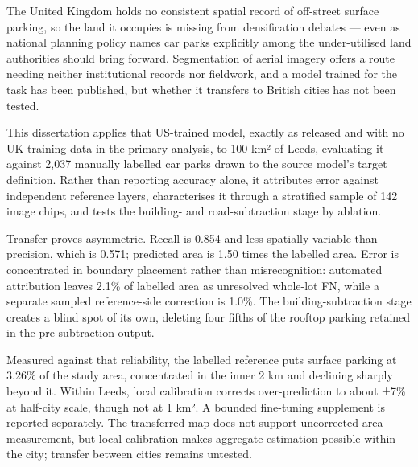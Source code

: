 The United Kingdom holds no consistent spatial record of off-street surface parking, so the land it occupies is missing from densification debates --- even as national planning policy names car parks explicitly among the under-utilised land authorities should bring forward. Segmentation of aerial imagery offers a route needing neither institutional records nor fieldwork, and a model trained for the task has been published, but whether it transfers to British cities has not been tested.

This dissertation applies that US-trained model, exactly as released and with no UK training data in the primary analysis, to 100 km² of Leeds, evaluating it against 2,037 manually labelled car parks drawn to the source model's target definition. Rather than reporting accuracy alone, it attributes error against independent reference layers, characterises it through a stratified sample of 142 image chips, and tests the building- and road-subtraction stage by ablation.

Transfer proves asymmetric. Recall is 0.854 and less spatially variable than precision, which is 0.571; predicted area is 1.50 times the labelled area. Error is concentrated in boundary placement rather than misrecognition: automated attribution leaves 2.1\% of labelled area as unresolved whole-lot FN, while a separate sampled reference-side correction is 1.0\%. The building-subtraction stage creates a blind spot of its own, deleting four fifths of the rooftop parking retained in the pre-subtraction output.

Measured against that reliability, the labelled reference puts surface parking at 3.26\% of the study area, concentrated in the inner 2 km and declining sharply beyond it. Within Leeds, local calibration corrects over-prediction to about ±7\% at half-city scale, though not at 1 km². A bounded fine-tuning supplement is reported separately. The transferred map does not support uncorrected area measurement, but local calibration makes aggregate estimation possible within the city; transfer between cities remains untested.
